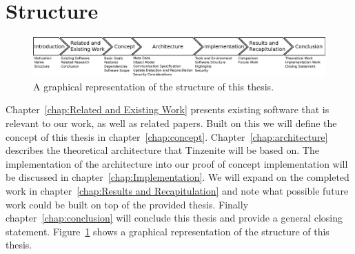 \section{Structure}
\label{sec:Structure}

\begin{figure}[htp]
\centering
    \includegraphics[width=\linewidth]{diagram/thesis_structure}
\caption[Thesis Structure Diagram]{A graphical representation of the structure of this thesis.}
\label{fig:thesis_structure}
\end{figure}

Chapter~\ref{chap:Related and Existing Work} presents existing software that is relevant to our work, as well as related papers.
Built on this we will define the concept of this thesis in chapter~\ref{chap:concept}.
Chapter~\ref{chap:architecture} describes the theoretical architecture that Tinzenite will be based on.
The implementation of the architecture into our proof of concept implementation will be discussed in chapter~\ref{chap:Implementation}.
We will expand on the completed work in chapter~\ref{chap:Results and Recapitulation} and note what possible future work could be built on top of the provided thesis.
Finally chapter~\ref{chap:conclusion} will conclude this thesis and provide a general closing statement.
Figure~\ref{fig:thesis_structure} shows a graphical representation of the structure of this thesis.
